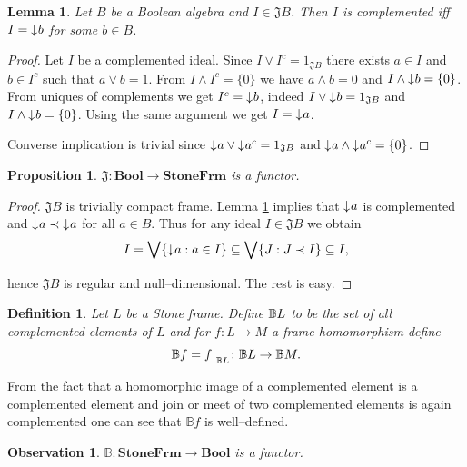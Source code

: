 \documentclass[12pt,a4paper,fleqn]{report}
\makeatletter
\newcounter{thmCounter}[section]
\theoremstyle{newthmstyle}
\newtheorem{lemma}[thmCounter]{Lemma}
\newtheorem{proposition}[thmCounter]{Proposition}
\newtheorem{observation}[thmCounter]{Observation}
\theoremstyle{newthmstyleNormal}
\newtheorem{definition}[thmCounter]{Definition}
\newcommand\categoryStyle[1]{\ensuremath{\mathbf{#1}}}
\newcommand\StoneFrm{\categoryStyle{StoneFrm}}
\newcommand\Bool{\categoryStyle{Bool}}
\newcommand\J{\ensuremath{\mathfrak{J}}}
\newcommand\Bc{\ensuremath{\mathbb{B}}} %
\newcommand\downset{\mathord{\downarrow}\mkern1mu} %
\newcommand\rbelow{\prec}
\newcommand\restr[2]{{%
  \left.\kern-\nulldelimiterspace %
  #1 %
  \vphantom{\big|} %
  \right|_{#2} %
}}
\newcommand\DEFSYM[2]{\index{#1@#2}\emph{#2}}
\makeatother
\begin{document}
\begin{lemma}\label{p:complIdeal}
    Let $B$ be a Boolean algebra and $I \in \J B$. Then $I$ is complemented iff $I = \downset b$ for some $b \in B$.
\end{lemma}
\begin{proof}
    Let $I$ be a complemented ideal. Since $I \vee I^c = 1_{\J B}$ there exists $a \in I$ and $b \in I^c$ such that $a \vee b = 1$. From $I \wedge I^c = \{0\}$ we have $a \wedge b = 0$ and $I \wedge \downset b = \{0\}$.
    From uniques of complements we get $I^c = \downset b$, indeed $I \vee \downset b = 1_{\J B}$ and $I \wedge \downset b = \{0\}$. Using the same argument we get $I = \downset a$.

    Converse implication is trivial since $\downset a \vee \downset a^c = 1_{\J B}$ and $\downset a \wedge \downset a^c = \{0\}$.
\end{proof}

\begin{proposition}
    $\J\colon \Bool \to \StoneFrm$ is a functor.
\end{proposition}
\begin{proof}
    $\J B$ is trivially compact frame. Lemma \ref{p:complIdeal} implies that $\downset a$ is complemented and $\downset a \rbelow \downset a$ for all $a \in B$. Thus for any ideal $I \in \J B$ we obtain
    $$ I = \bigvee \{ \downset a : a \in I \} \subseteq \bigvee \{ J : J \rbelow I \} \subseteq I,$$

\noindent hence $\J B$ is regular and null--dimensional. The rest is easy.
\end{proof}

\begin{definition}
    Let $L$ be a Stone frame. Define $\DEFSYM{Bc}{\Bc} L$ to be the set of all complemented elements of $L$ and for $f\colon L \to M$ a frame homomorphism define
    $$\Bc f = \restr{f}{\Bc L}\colon \Bc L \to \Bc M.$$
\end{definition}

From the fact that a homomorphic image of a complemented element is a complemented element and join or meet of two complemented elements is again complemented one can see that $\Bc f$ is well--defined. %

\begin{observation}
    $\Bc\colon \StoneFrm \to \Bool$ is a functor.
\end{observation}
\end{document}
